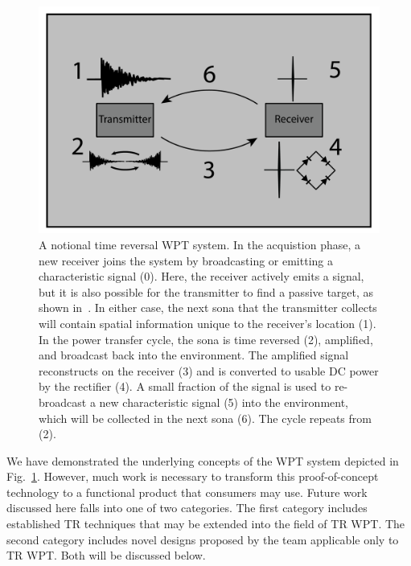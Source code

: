 \begin{figure}[t]
\includegraphics[width=\columnwidth]{figs/future/WPTSys}
\caption[Proposed Time Reversal System]{A notional time reversal WPT system. In the acquistion phase, a new receiver joins the system by broadcasting or emitting a characteristic signal (0). Here, the receiver actively emits a signal, but it is also possible for the transmitter to find a passive target, as shown in~\cite{nltr-wave-chaotic}. In either case, the next sona that the transmitter collects will contain spatial information unique to the receiver's location (1). In the power transfer cycle, the sona is time reversed (2), amplified, and broadcast back into the environment. The amplified signal reconstructs on the receiver (3) and is converted to usable DC power by the rectifier (4). A small fraction of the signal is used to re-broadcast a new characteristic signal (5) into the environment, which will be collected in the next sona (6). The cycle repeats from (2).}
\label{fig:SysImage}
\end{figure}

We have demonstrated the underlying concepts of the WPT system depicted in Fig.~\ref{fig:SysImage}.
However, much work is necessary to transform this proof-of-concept technology to a functional product that consumers may use.
Future work discussed here falls into one of two categories. The first category includes established TR techniques that may be extended into the field of TR WPT.
The second category includes novel designs proposed by the team applicable only to TR WPT. Both will be discussed below. 

